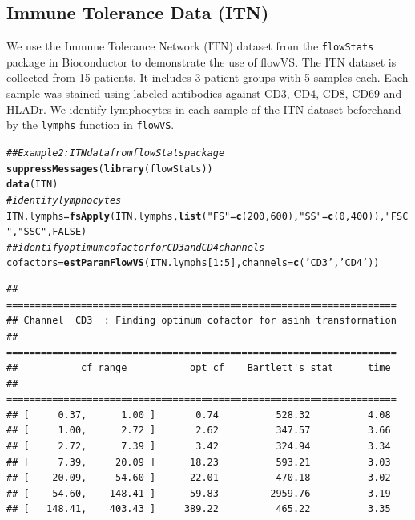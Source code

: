 \documentclass{article}\usepackage[]{graphicx}\usepackage[]{color}
\makeatletter
\newcommand{\hlnum}[1]{\textcolor[rgb]{0.686,0.059,0.569}{#1}}%
\newcommand{\hlstr}[1]{\textcolor[rgb]{0.192,0.494,0.8}{#1}}%
\newcommand{\hlcom}[1]{\textcolor[rgb]{0.678,0.584,0.686}{\textit{#1}}}%
\newcommand{\hlopt}[1]{\textcolor[rgb]{0,0,0}{#1}}%
\newcommand{\hlstd}[1]{\textcolor[rgb]{0.345,0.345,0.345}{#1}}%
\newcommand{\hlkwb}[1]{\textcolor[rgb]{0.69,0.353,0.396}{#1}}%
\newcommand{\hlkwc}[1]{\textcolor[rgb]{0.333,0.667,0.333}{#1}}%
\newcommand{\hlkwd}[1]{\textcolor[rgb]{0.737,0.353,0.396}{\textbf{#1}}}%
\newenvironment{kframe}{%
 \def\at@end@of@kframe{}%
 \ifinner\ifhmode%
  \def\at@end@of@kframe{\end{minipage}}%
  \begin{minipage}{\columnwidth}%
 \fi\fi%
 \def\FrameCommand##1{\hskip\@totalleftmargin \hskip-\fboxsep
 \colorbox{shadecolor}{##1}\hskip-\fboxsep
     \hskip-\linewidth \hskip-\@totalleftmargin \hskip\columnwidth}%
 \MakeFramed {\advance\hsize-\width
   \@totalleftmargin\z@ \linewidth\hsize
   \@setminipage}}%
 {\par\unskip\endMakeFramed%
 \at@end@of@kframe}
\newenvironment{knitrout}{}{} %
\newcommand{\Rpackage}[1]{{\texttt{#1}}}
\makeatother
\begin{document}
\subsection{Immune Tolerance Data (ITN)}
We use the Immune Tolerance Network (ITN) dataset from the \Rpackage{flowStats} package in Bioconductor to demonstrate the use of flowVS.
The ITN dataset is collected from 15 patients. It includes 3 patient groups with 5 samples each. 
Each sample was stained using labeled antibodies against CD3, CD4, CD8, CD69 and HLADr.
We identify lymphocytes in each sample of the ITN dataset beforehand by the \texttt{lymphs} function in \Rpackage{flowVS}.


\begin{knitrout}
\color{fgcolor}\begin{kframe}
\begin{alltt}
\hlcom{## Example 2: ITN data from flowStats package}
\hlkwd{suppressMessages}\hlstd{(}\hlkwd{library}\hlstd{(flowStats))}
\hlkwd{data}\hlstd{(ITN)}
\hlcom{# identify lymphocytes}
\hlstd{ITN.lymphs} \hlkwb{=} \hlkwd{fsApply}\hlstd{(ITN,lymphs,} \hlkwd{list}\hlstd{(}\hlstr{"FS"}\hlstd{=}\hlkwd{c}\hlstd{(}\hlnum{200}\hlstd{,} \hlnum{600}\hlstd{),}\hlstr{"SS"}\hlstd{=}\hlkwd{c}\hlstd{(}\hlnum{0}\hlstd{,} \hlnum{400}\hlstd{)),} \hlstr{"FSC"}\hlstd{,} \hlstr{"SSC"}\hlstd{,}\hlnum{FALSE}\hlstd{)}
\hlcom{## identify optimum cofactor for CD3 and CD4 channels}
\hlstd{cofactors} \hlkwb{=} \hlkwd{estParamFlowVS}\hlstd{(ITN.lymphs[}\hlnum{1}\hlopt{:}\hlnum{5}\hlstd{],}\hlkwc{channels}\hlstd{=}\hlkwd{c}\hlstd{(}\hlstr{'CD3'}\hlstd{,} \hlstr{'CD4'}\hlstd{))}
\end{alltt}
\begin{verbatim}
## ====================================================================
## Channel  CD3  : Finding optimum cofactor for asinh transformation
## ====================================================================
##           cf range           opt cf    Bartlett's stat      time 
## ====================================================================
## [     0.37,      1.00 ]       0.74          528.32          4.08 
## [     1.00,      2.72 ]       2.62          347.57          3.66 
## [     2.72,      7.39 ]       3.42          324.94          3.34 
## [     7.39,     20.09 ]      18.23          593.21          3.03 
## [    20.09,     54.60 ]      22.01          470.18          3.02 
## [    54.60,    148.41 ]      59.83         2959.76          3.19 
## [   148.41,    403.43 ]     389.22          465.22          3.35 

\end{verbatim}
\end{kframe}
\end{knitrout}
\end{document}
